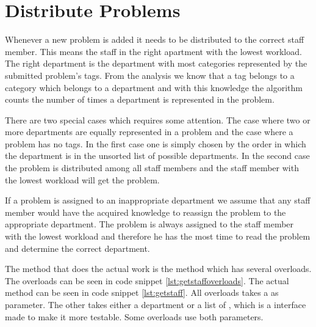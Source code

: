 \section{Distribute Problems}
\label{sec:dispro}
Whenever a new problem is added it needs to be distributed to the correct staff member.
This means the staff in the right apartment with the lowest workload. 
The right department is the department with most categories represented by the submitted problem's tags.
From the analysis we know that a tag belongs to a category which belongs to a department and with this knowledge the algorithm counts the number of times a department is represented in the problem.

There are two special cases which requires some attention. 
The case where two or more departments are equally represented in a problem and the case where a problem has no tags. 
In the first case one is simply chosen by the order in which the department is in the unsorted list of possible departments. 
In the second case the problem is distributed among all staff members and the staff member with the lowest workload will get the problem. 

If a problem is assigned to an inappropriate department we assume that any staff member would have the acquired knowledge to reassign the problem to the appropriate department. 
The problem is always assigned to the staff member with the lowest workload and therefore he has the most time to read the problem and determine the correct department.

The method that does the actual work is the  method which has several overloads. The overloads can be seen in code snippet \ref{lst:getstaffoverloads}. The actual method can be seen in code snippet \ref{lst:getstaff}. 
All overloads takes a  as parameter. 
The other takes either a department or a list of , which is a  interface made to make it more testable. 
Some overloads use both parameters.


